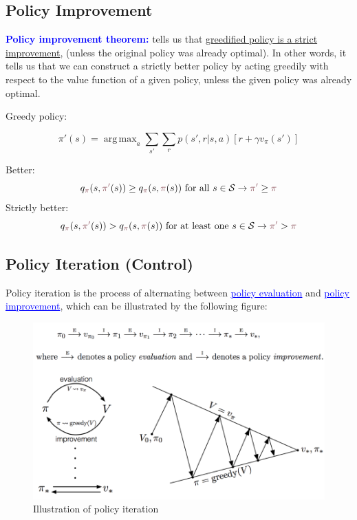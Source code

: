 \documentclass[12pt, a4paper]{article}
\DeclareMathOperator*{\argmax}{arg\,max} %
\begin{document}
\subsection{Policy Improvement}\label{policy-improvement}

\textbf{\textcolor{blue}{Policy improvement theorem:}} tells us that \uline{greedified policy is a strict improvement}, (unless the original policy was already optimal). In other words, it tells us that we can construct a strictly better policy by acting greedily with respect to the value function of a given policy, unless the given policy was already optimal.

Greedy policy:

$$
\pi'(s) =  \argmax_a \sum_{s'} \sum_r p(s',r | s,a)[r + \gamma v_\pi(s')]
$$


Better:
$$
q_{\textcolor[HTML]{8F5760}{\pi}}(s,\textcolor[HTML]{8F5760}{\pi'}(s)) \geq  q_{\textcolor[HTML]{8F5760}{\pi}}(s,\textcolor[HTML]{8F5760}{\pi}(s)) \text{ for all } s \in \mathcal{S} \rightarrow \textcolor[HTML]{8F5760}{\pi'} \geq \textcolor[HTML]{8F5760}{\pi}
$$
Strictly better:
$$
q_{\textcolor[HTML]{8F5760}{\pi}}(s,\textcolor[HTML]{8F5760}{\pi'}(s)) >  q_{\textcolor[HTML]{8F5760}{\pi}}(s,\textcolor[HTML]{8F5760}{\pi}(s)) \text{ for at least one } s \in \mathcal{S} \rightarrow \textcolor[HTML]{8F5760}{\pi'} > \textcolor[HTML]{8F5760}{\pi}
$$





\subsection{Policy Iteration (Control)}\label{policy-iteration}


Policy iteration is the process of alternating between \textcolor{blue}{\uline{policy evaluation}} and \textcolor{blue}{\uline{policy improvement}}, which can be illustrated by the following figure:


\begin{figure}[H]
  \centering  %
    \includegraphics[width=0.9\columnwidth]{images/policy-iteration.png}
    \caption{Illustration of policy iteration}
    \label{fig:policy-iteration}
\end{figure}
\end{document}
